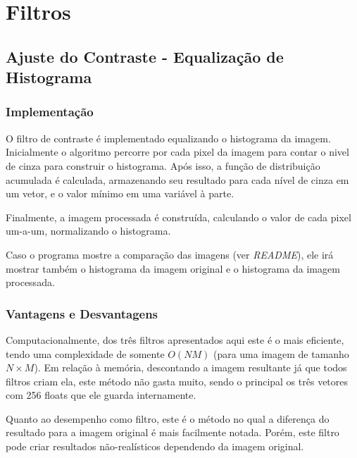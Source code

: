 




\cabecalho

\section{Filtros}

\subsection{Ajuste do Contraste - Equalização de Histograma}
\subsubsection{Implementação}
O filtro de contraste é implementado equalizando o histograma da imagem. Inicialmente o algoritmo percorre por cada pixel
da imagem para contar o nivel de cinza para construir o histograma. Após isso, a função de distribuição acumulada é 
calculada, armazenando seu resultado para cada nível de cinza em um vetor, e o valor mínimo em uma variável à parte.

Finalmente, a imagem processada é construída, calculando o valor de cada pixel um-a-um, normalizando o histograma.

Caso o programa mostre a comparação das imagens (ver \textit{README}), ele irá mostrar também o histograma da imagem
original e o histograma da imagem processada.

\subsubsection{Vantagens e Desvantagens}
Computacionalmente, dos três filtros apresentados aqui este é o mais eficiente, tendo uma complexidade de somente $O(NM)$
(para uma imagem de tamanho $N\times M$). Em relação à memória, descontando a imagem resultante já que todos filtros 
criam ela, este método não gasta muito, sendo o principal os três vetores com 256 floats que ele guarda internamente.

Quanto ao desempenho como filtro, este é o método no qual a diferença do resultado para a imagem original é mais facilmente
notada. Porém, este filtro pode criar resultados não-realísticos dependendo da imagem original.

